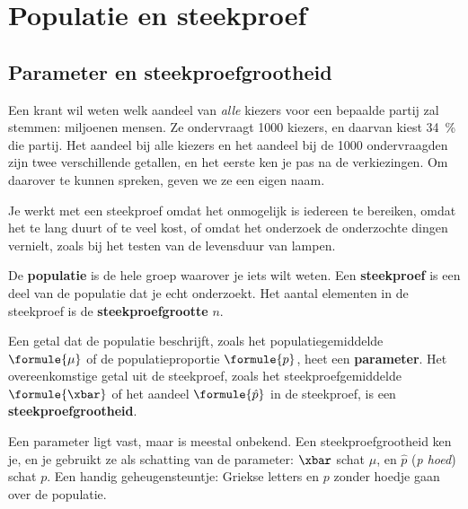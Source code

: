 \section{Populatie en steekproef}

\subsection{Parameter en steekproefgrootheid}

Een krant wil weten welk aandeel van \textit{alle} kiezers voor een bepaalde partij zal stemmen: miljoenen mensen. Ze ondervraagt 1000 kiezers, en daarvan kiest 34~\% die partij. Het aandeel bij alle kiezers en het aandeel bij de 1000 ondervraagden zijn twee verschillende getallen, en het eerste ken je pas na de verkiezingen. Om daarover te kunnen spreken, geven we ze een eigen naam.

Je werkt met een steekproef omdat het onmogelijk is iedereen te bereiken, omdat het te lang duurt of te veel kost, of omdat het onderzoek de onderzochte dingen vernielt, zoals bij het testen van de levensduur van lampen.

\begin{theorie}
De \textbf{\textcolor{accent}{populatie}} is de hele groep waarover je iets wilt weten. Een \textbf{\textcolor{accent}{steekproef}} is een deel van de populatie dat je echt onderzoekt. Het aantal elementen in de steekproef is de \textbf{\textcolor{accent}{steekproefgrootte}} $n$.

\vspace{1mm}
Een getal dat de populatie beschrijft, zoals het populatiegemiddelde $\formule{\mu}$ of de populatieproportie $\formule{p}$, heet een \textbf{\textcolor{accent}{parameter}}. Het overeenkomstige getal uit de steekproef, zoals het steekproefgemiddelde $\formule{\xbar}$ of het aandeel $\formule{\hat{p}}$ in de steekproef, is een \textbf{\textcolor{accent}{steekproefgrootheid}}.
\end{theorie}

Een parameter ligt vast, maar is meestal onbekend. Een steekproefgrootheid ken je, en je gebruikt ze als schatting van de parameter: $\xbar$ schat $\mu$, en $\hat{p}$ (\textit{p hoed}) schat $p$. Een handig geheugensteuntje: Griekse letters en $p$ zonder hoedje gaan over de populatie.

